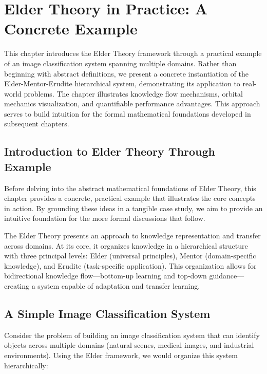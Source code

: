 \chapter{Elder Theory in Practice: A Concrete Example}

\begin{tcolorbox}[colback=DarkSkyBlue!5!white,colframe=DarkSkyBlue!75!black,title=Chapter Summary]
This chapter introduces the Elder Theory framework through a practical example of an image classification system spanning multiple domains. Rather than beginning with abstract definitions, we present a concrete instantiation of the Elder-Mentor-Erudite hierarchical system, demonstrating its application to real-world problems. The chapter illustrates knowledge flow mechanisms, orbital mechanics visualization, and quantifiable performance advantages. This approach serves to build intuition for the formal mathematical foundations developed in subsequent chapters.
\end{tcolorbox}

\section{Introduction to Elder Theory Through Example}

Before delving into the abstract mathematical foundations of Elder Theory, this chapter provides a concrete, practical example that illustrates the core concepts in action. By grounding these ideas in a tangible case study, we aim to provide an intuitive foundation for the more formal discussions that follow.

The Elder Theory presents an approach to knowledge representation and transfer across domains. At its core, it organizes knowledge in a hierarchical structure with three principal levels: Elder (universal principles), Mentor (domain-specific knowledge), and Erudite (task-specific application). This organization allows for bidirectional knowledge flow—bottom-up learning and top-down guidance—creating a system capable of adaptation and transfer learning.

\section{A Simple Image Classification System}

Consider the problem of building an image classification system that can identify objects across multiple domains (natural scenes, medical images, and industrial environments). Using the Elder framework, we would organize this system hierarchically:

